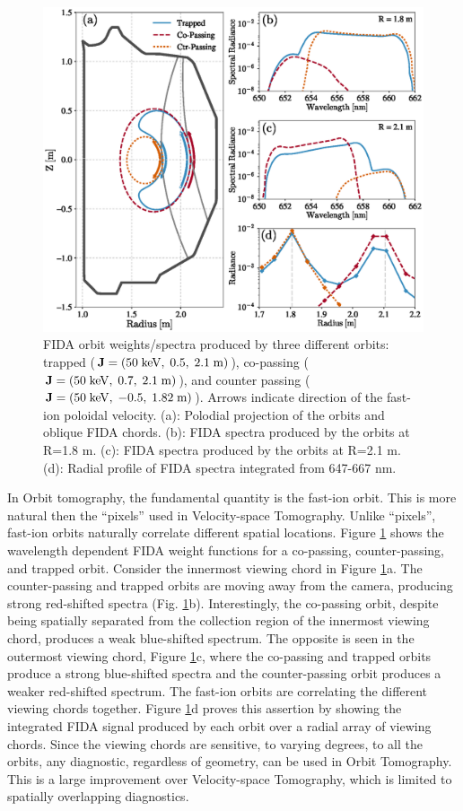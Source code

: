 \begin{figure}[h!]
    \centering
    \includegraphics[width=15cm]{figures/orbit_fida_spectra.eps}
    \caption{FIDA orbit weights/spectra produced by three different orbits: trapped ($\rm{\mathbf{J}=(50\;keV,\;0.5,\;2.1\;m)}$), co-passing ($\rm{\mathbf{J}=(50\;keV,\;0.7,\;2.1\;m)}$), and counter passing ($\rm{\mathbf{J}=(50\;keV,\;-0.5,\;1.82\;m)}$). Arrows indicate direction of the fast-ion poloidal velocity. (a): Polodial projection of the orbits and oblique FIDA chords. (b): FIDA spectra produced by the orbits at R=1.8 m. (c): FIDA spectra produced by the orbits at R=2.1 m. (d): Radial profile of FIDA spectra integrated from 647-667 nm.}
    \label{fig:orbit_fida_spectra}
\end{figure}
In Orbit tomography, the fundamental quantity is the fast-ion orbit. This is more natural then the ``pixels'' used in Velocity-space Tomography. Unlike ``pixels'', fast-ion orbits naturally correlate different spatial locations.
Figure \ref{fig:orbit_fida_spectra} shows the wavelength dependent FIDA weight functions for a co-passing, counter-passing, and trapped orbit. Consider the innermost viewing chord in Figure \ref{fig:orbit_fida_spectra}a. The counter-passing and trapped orbits are moving away from the camera, producing strong red-shifted spectra (Fig. \ref{fig:orbit_fida_spectra}b). Interestingly, the co-passing orbit, despite being spatially separated from the collection region of the innermost viewing chord, produces a weak blue-shifted spectrum. The opposite is seen in the outermost viewing chord, Figure \ref{fig:orbit_fida_spectra}c, where the co-passing and trapped orbits produce a strong blue-shifted spectra and the counter-passing orbit produces a weaker red-shifted spectrum. The fast-ion orbits are correlating the different viewing chords together. Figure \ref{fig:orbit_fida_spectra}d proves this assertion by showing the integrated FIDA signal produced by each orbit over a radial array of viewing chords. Since the viewing chords are sensitive, to varying degrees, to all the orbits, any diagnostic, regardless of geometry, can be used in Orbit Tomography. This is a large improvement over Velocity-space Tomography, which is limited to spatially overlapping diagnostics. 

